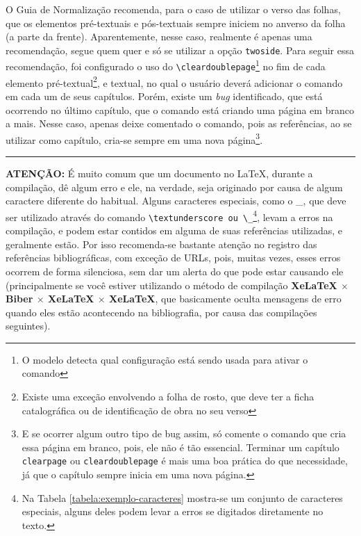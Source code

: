 O Guia de Normalização recomenda, para o caso de utilizar o verso das folhas, que os elementos pré-textuais e pós-textuais sempre iniciem no anverso da folha (a parte da frente). Aparentemente, nesse caso, realmente é apenas uma recomendação, segue quem quer e só se utilizar a opção \texttt{twoside}. Para seguir essa recomendação, foi configurado o uso do \verb|\cleardoublepage|\footnote{O modelo detecta qual configuração está sendo usada para ativar o comando} no fim de cada elemento pré-textual\footnote{Existe uma exceção envolvendo a folha de rosto, que deve ter a ficha catalográfica ou de identificação de obra no seu verso}, e textual, no qual o usuário deverá adicionar o comando em cada um de seus capítulos. Porém, existe um \textit{bug} identificado, que está ocorrendo no último capítulo, que o comando está criando uma página em branco a mais. Nesse caso, apenas deixe comentado o comando, pois as referências, ao se utilizar como capítulo, cria-se sempre em uma nova página\footnote{E se ocorrer algum outro tipo de bug assim, só comente o comando que cria essa página em branco, pois, ele não é tão essencial. Terminar um capítulo \texttt{clearpage} ou \texttt{cleardoublepage} é mais uma boa prática do que necessidade, já que o capítulo sempre inicia em uma nova página.}.


\vspace{\baselineskip}
\begin{Center}
    \rule{12cm}{1pt}
\end{Center}

\textbf{ATENÇÃO:} É muito comum que um documento no \LaTeX{}, durante a compilação, dê algum erro e ele, na verdade, seja originado por causa de algum caractere diferente do habitual. Alguns caracteres especiais, como o \_, que deve ser utilizado através do comando \verb|\textunderscore ou \_|\footnote{Na Tabela \ref{tabela:exemplo-caracteres} mostra-se um conjunto de caracteres especiais, alguns deles podem levar a erros se digitados diretamente no texto.}, levam a erros na compilação, e podem estar contidos em alguma de suas referências utilizadas, e geralmente estão. Por isso recomenda-se bastante atenção no registro das referências bibliográficas, com exceção de URLs, pois, muitas vezes, esses erros ocorrem de forma silenciosa, sem dar um alerta do que pode estar causando ele (principalmente se você estiver utilizando o método de compilação \textbf{XeLaTeX $\times$ Biber $\times$ XeLaTeX $\times$ XeLaTeX}, que basicamente oculta mensagens de erro quando eles estão acontecendo na bibliografia, por causa das compilações seguintes).